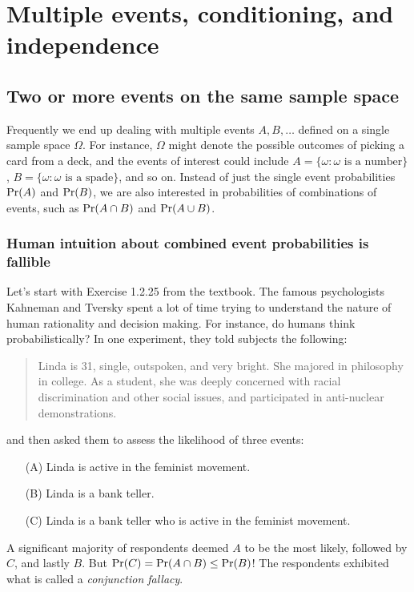 \chapter{Multiple events, conditioning, and independence}

\section{Two or more events on the same sample space}

Frequently we end up dealing with multiple events $A,B,\ldots$ defined on a single sample space $\Omega$. For instance, $\Omega$ might denote the possible outcomes of picking a card from a deck, and the events of interest could include $A = \{\omega: \mbox{$\omega$ is a number}\}$, $B = \{\omega: \mbox{$\omega$ is a spade}\}$, and so on. Instead of just the single event probabilities $\mbox{\rm Pr}(A)$ and $\mbox{\rm Pr}(B)$, we are also interested in probabilities of combinations of events, such as $\mbox{\rm Pr}(A \cap B)$ and $\mbox{\rm Pr}(A \cup B)$.

\subsection{Human intuition about combined event probabilities is fallible}

Let's start with Exercise 1.2.25 from the textbook. The famous psychologists Kahneman and Tversky spent a lot of time trying to understand the nature of human rationality and decision making. For instance, do humans think probabilistically? In one experiment, they told subjects the following:
\begin{quote}
Linda is 31, single, outspoken, and very bright. She majored in philosophy in college. As a student, she was deeply concerned with racial discrimination and other social issues, and participated in anti-nuclear demonstrations.
\end{quote}
and then asked them to assess the likelihood of three events:
\begin{enumerate}
\item[(A)] Linda is active in the feminist movement.
\item[(B)] Linda is a bank teller.
\item[(C)] Linda is a bank teller who is active in the feminist movement.
\end{enumerate}
A significant majority of respondents deemed $A$ to be the most likely, followed by $C$, and lastly $B$. But $\mbox{\rm Pr}(C) = \mbox{\rm Pr}(A \cap B) \leq \mbox{\rm Pr}(B)$! The respondents exhibited what is called a {\it conjunction fallacy}.

